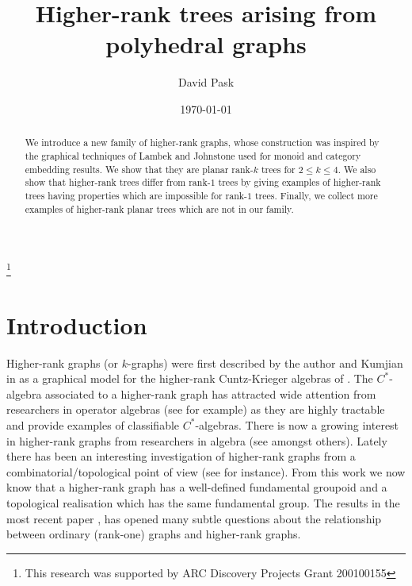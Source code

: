 \documentclass[12pt]{amsart}
\theoremstyle{definition}
\theoremstyle{remark}
\numberwithin{equation}{section}
\begin{document}
\title[Higher-rank trees]{Higher-rank trees arising from polyhedral graphs}

\begin{abstract}

We introduce a new family of higher-rank graphs, whose construction was inspired by the graphical techniques of Lambek \cite{Lambek} and Johnstone \cite{Johnstone} used for monoid and category embedding results. We show that they are planar rank-$k$ trees 
for $2 \le k \le 4$. We also show that higher-rank trees differ from rank-$1$ trees by giving examples of higher-rank trees having properties which are impossible for rank-$1$ trees. Finally, we collect more examples of higher-rank planar trees which are not in our family.
\end{abstract}

\date{\today}
\thanks{This research was supported by ARC Discovery Projects Grant 200100155}

\author{David Pask}
\address{David Pask \\ School of Mathematics and
Applied Statistics  \\
The University of Wollongong\\
NSW  2522\\
AUSTRALIA} 

\maketitle
  
\section{Introduction}

Higher-rank graphs (or $k$-graphs) were first described by the author and Kumjian in \cite{KP2} as a graphical model for the higher-rank Cuntz-Krieger algebras of \cite{RobSteg1}. The $C^*$-algebra associated to a higher-rank graph has attracted wide attention from researchers in operator algebras (see \cite{E,FGLP,LV,Sp,Y1,Y} for example) as they are highly tractable and provide examples of classifiable $C^*$-algebras.
There is now a growing interest in higher-rank graphs from researchers in algebra (see \cite{CFaH,LPIS,Pre,Ros} amongst others). Lately there has been an interesting investigation of higher-rank graphs from a combinatorial/topological point of view (see \cite{bkps,KKQS,KPSW,PQR1,PQR2} for instance). From this work we now know that a higher-rank graph has a well-defined fundamental groupoid and a topological realisation which has the same fundamental group. The results in the most recent paper \cite{bkps}, has opened many subtle questions about the relationship between ordinary (rank-one) graphs and higher-rank graphs.
\end{document}

